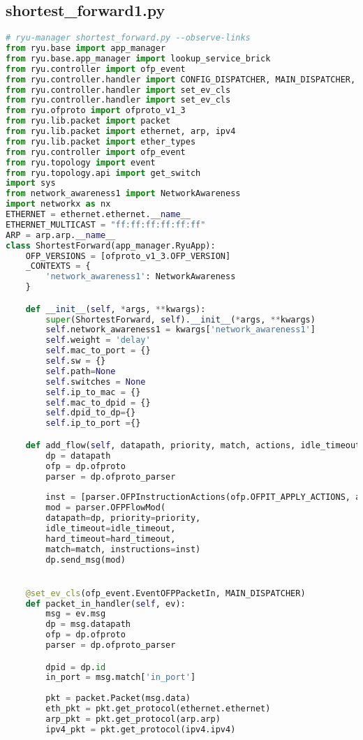 \documentclass{xjtureport}
\begin{document}
\subsection{shortest\_forward1.py}
\begin{lstlisting}[language=python]
# ryu-manager shortest_forward.py --observe-links
from ryu.base import app_manager
from ryu.base.app_manager import lookup_service_brick
from ryu.controller import ofp_event
from ryu.controller.handler import CONFIG_DISPATCHER, MAIN_DISPATCHER, DEAD_DISPATCHER, HANDSHAKE_DISPATCHER
from ryu.controller.handler import set_ev_cls
from ryu.controller.handler import set_ev_cls
from ryu.ofproto import ofproto_v1_3
from ryu.lib.packet import packet
from ryu.lib.packet import ethernet, arp, ipv4
from ryu.lib.packet import ether_types
from ryu.controller import ofp_event
from ryu.topology import event
from ryu.topology.api import get_switch
import sys
from network_awareness1 import NetworkAwareness
import networkx as nx
ETHERNET = ethernet.ethernet.__name__
ETHERNET_MULTICAST = "ff:ff:ff:ff:ff:ff"
ARP = arp.arp.__name__
class ShortestForward(app_manager.RyuApp):
	OFP_VERSIONS = [ofproto_v1_3.OFP_VERSION]
	_CONTEXTS = {
		'network_awareness1': NetworkAwareness
	}

	def __init__(self, *args, **kwargs):
		super(ShortestForward, self).__init__(*args, **kwargs)
		self.network_awareness1 = kwargs['network_awareness1']
		self.weight = 'delay'
		self.mac_to_port = {}
		self.sw = {}
		self.path=None
		self.switches = None
		self.ip_to_mac = {}
		self.mac_to_dpid = {}
		self.dpid_to_dp={}
		self.ip_to_port ={}

	def add_flow(self, datapath, priority, match, actions, idle_timeout=0, hard_timeout=0):
		dp = datapath
		ofp = dp.ofproto
		parser = dp.ofproto_parser
		
		inst = [parser.OFPInstructionActions(ofp.OFPIT_APPLY_ACTIONS, actions)]
		mod = parser.OFPFlowMod(
		datapath=dp, priority=priority,
		idle_timeout=idle_timeout,
		hard_timeout=hard_timeout,
		match=match, instructions=inst)
		dp.send_msg(mod)


	@set_ev_cls(ofp_event.EventOFPPacketIn, MAIN_DISPATCHER)
	def packet_in_handler(self, ev):
		msg = ev.msg
		dp = msg.datapath
		ofp = dp.ofproto
		parser = dp.ofproto_parser

		dpid = dp.id
		in_port = msg.match['in_port']
		
		pkt = packet.Packet(msg.data)
		eth_pkt = pkt.get_protocol(ethernet.ethernet)
		arp_pkt = pkt.get_protocol(arp.arp)
		ipv4_pkt = pkt.get_protocol(ipv4.ipv4)
		

\end{lstlisting}
\end{document}
